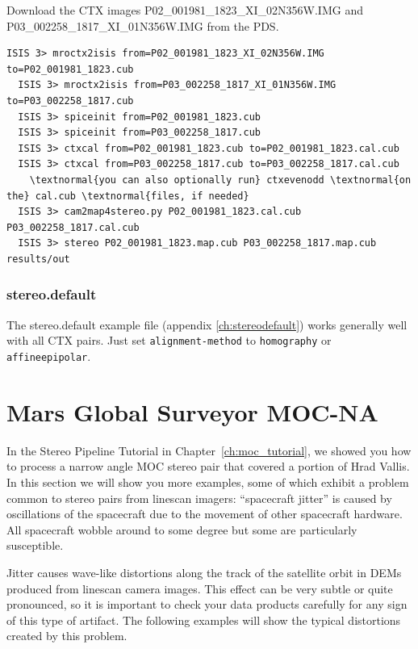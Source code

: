 Download the \ac{CTX} images P02\_001981\_1823\_XI\_02N356W.IMG and
P03\_002258\_1817\_XI\_01N356W.IMG from the \ac{PDS}.
\begin{Verbatim}[commandchars=\\\{\}]
  ISIS 3> mroctx2isis from=P02_001981_1823_XI_02N356W.IMG to=P02_001981_1823.cub
  ISIS 3> mroctx2isis from=P03_002258_1817_XI_01N356W.IMG to=P03_002258_1817.cub
  ISIS 3> spiceinit from=P02_001981_1823.cub
  ISIS 3> spiceinit from=P03_002258_1817.cub
  ISIS 3> ctxcal from=P02_001981_1823.cub to=P02_001981_1823.cal.cub
  ISIS 3> ctxcal from=P03_002258_1817.cub to=P03_002258_1817.cal.cub
    \textnormal{you can also optionally run} ctxevenodd \textnormal{on the} cal.cub \textnormal{files, if needed}
  ISIS 3> cam2map4stereo.py P02_001981_1823.cal.cub P03_002258_1817.cal.cub
  ISIS 3> stereo P02_001981_1823.map.cub P03_002258_1817.map.cub results/out
\end{Verbatim}

\subsubsection*{stereo.default}

The stereo.default example file (appendix \ref{ch:stereodefault})
works generally well with all CTX pairs. Just set
\texttt{alignment-method} to \texttt{homography} or
\texttt{affineepipolar}.

\clearpage
\section{Mars Global Surveyor MOC-NA}

In the Stereo Pipeline Tutorial in Chapter~\ref{ch:moc_tutorial}, we
showed you how to process a narrow angle \ac{MOC} stereo pair that
covered a portion of Hrad Vallis. In this section we will show you
more examples, some of which exhibit a problem common to stereo
pairs from linescan imagers: ``spacecraft jitter'' is caused by
oscillations of the spacecraft due to the movement of other spacecraft
hardware.  All spacecraft wobble around to some degree but some are
particularly susceptible.

Jitter causes wave-like distortions along the track of the satellite
orbit in \acp{DEM} produced from linescan camera images.  This effect can
be very subtle or quite pronounced, so it is important to check your
data products carefully for any sign of this type of artifact. The
following examples will show the typical distortions created by this
problem.

